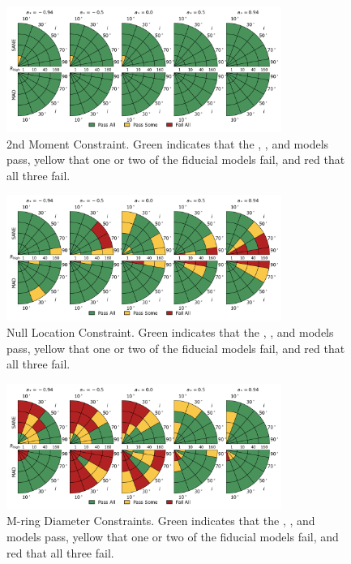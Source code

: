 \begin{figure}
  \centering
  \includegraphics[width=0.8\textwidth]{./figures/230GHz_size_Constraints.png}
  \caption{2nd Moment Constraint.  Green indicates that the \kharma, \bhac, and \hamr models pass, yellow that one or two of the fiducial models fail, and red that all three fail.}
  \label{fig:230GHz_size_pizza}
\end{figure}
\begin{figure}
  \centering
  \includegraphics[width=0.8\textwidth]{./figures/Null_loc_Constraints.png}
  \caption{Null Location Constraint.  Green indicates that the \kharma, \bhac, and \hamr models pass, yellow that one or two of the fiducial models fail, and red that all three fail.}
  \label{fig:null_pizza}
\end{figure}
\begin{figure}
  \centering
  \includegraphics[width=0.8\textwidth]{./figures/Mring_d_Constraints.png}
  \caption{M-ring Diameter Constraints.  Green indicates that the \kharma, \bhac, and \hamr models pass, yellow that one or two of the fiducial models fail, and red that all three fail.}
  \label{fig:mring_diam_pizza}
\end{figure}
